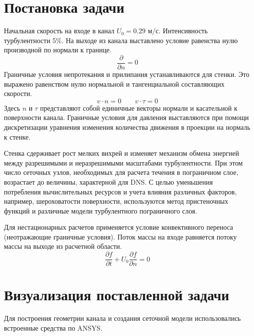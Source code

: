 \section{Постановка задачи}
	Начальная скорость на входе в канал $U_0 = 0.29$ м/с. Интенсивность турбулентности 5\%.
	На выходе из канала выставлено условие равенства нулю производной по нормали к границе.
	\begin{equation}
		\frac{\partial}{\partial n} = 0
	\end{equation}
	Граничные условия непротекания и прилипания устанавливаются для стенки. Это выражено равенством нулю нормальной и тангенциальной составляющих скорости.
	\begin{equation}
		v \cdot n = 0 \qquad v \cdot \tau = 0
	\end{equation}
	Здесь $n$ и $\tau$ представляют собой единичные векторы нормали и касательной к поверхности канала. Граничные условия для давления выставляются при помощи дискретизации уравнения изменения количества движения в проекции на нормаль к стенке.
	
	Стенка сдерживает рост мелких вихрей и изменяет механизм обмена энергией между разрешимыми и неразрешимыми масштабами турбулентности. При этом число сеточных узлов, необходимых для расчета течения в пограничном слое, возрастает до величины, характерной для DNS. С целью уменьшения потребления вычислительных ресурсов и учета влияния различных факторов, например, шероховатости поверхности, используются метод пристеночных функций и различные модели турбулентного пограничного слоя\cite{Cabot2000}.
	
	Для нестационарных расчетов применяется условие конвективного переноса (неотражающие граничные условия). Поток массы на входе равняется потоку массы на выходе из расчетной области.
	\begin{equation}
		\frac{\partial f}{\partial t} + U_0\frac{\partial f}{\partial n} = 0
	\end{equation}

\section{Визуализация поставленной задачи}
	Для построения геометрии канала и создания сеточной модели использовались встроенные средства по ANSYS.
